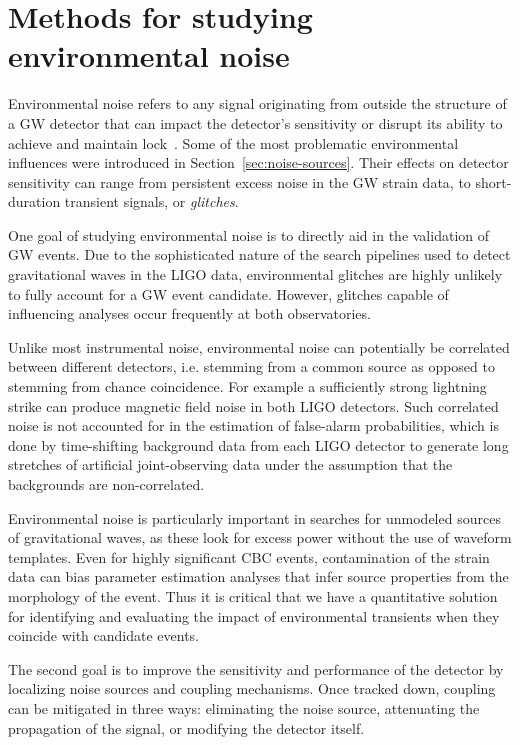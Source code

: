\chapter{Methods for studying environmental noise}\label{ch:noise-methods}

Environmental noise refers to any signal originating from outside the structure of a \ac{GW} detector that can impact the detector's sensitivity or disrupt its ability to achieve and maintain lock~\citep{Effler_2015, Nguyen_2021}.
Some of the most problematic environmental influences were introduced in Section~\ref{sec:noise-sources}.
Their effects on detector sensitivity can range from persistent excess noise in the \ac{GW} strain data, to short-duration transient signals, or \textit{glitches}.

One goal of studying environmental noise is to directly aid in the validation of \ac{GW} events.
Due to the sophisticated nature of the search pipelines used to detect gravitational waves in the \ac{LIGO} data, environmental glitches are highly unlikely to fully account for a \ac{GW} event candidate.
However, glitches capable of influencing analyses occur frequently at both observatories.

Unlike most instrumental noise, environmental noise can potentially be correlated between different detectors, i.e. stemming from a common source as opposed to stemming from chance coincidence.
For example a sufficiently strong lightning strike can produce magnetic field noise in both LIGO detectors.
Such correlated noise is not accounted for in the estimation of false-alarm probabilities, which is done by time-shifting background data from each LIGO detector to generate long stretches of artificial joint-observing data under the assumption that the backgrounds are non-correlated.

Environmental noise is particularly important in searches for unmodeled sources of gravitational waves, as these look for excess power without the use of waveform templates.
Even for highly significant \ac{CBC} events, contamination of the strain data can bias parameter estimation analyses that infer source properties from the morphology of the event.
Thus it is critical that we have a quantitative solution for identifying and evaluating the impact of environmental transients when they coincide with candidate events.

The second goal is to improve the sensitivity and performance of the detector by localizing noise sources and coupling mechanisms. Once tracked down, coupling can be mitigated in three ways: eliminating the noise source, attenuating the propagation of the signal, or modifying the detector itself.

